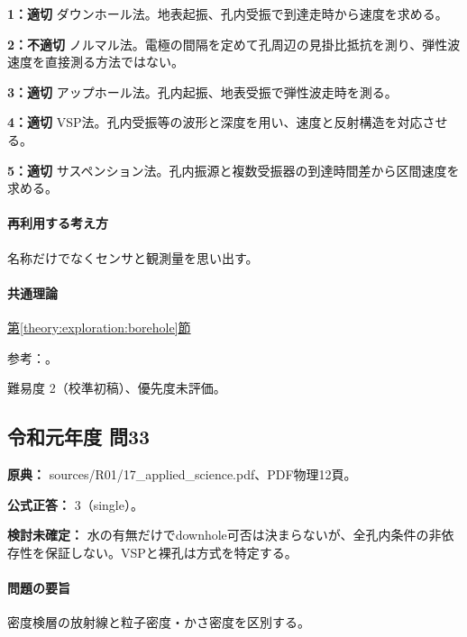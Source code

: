 \noindent\textbf{1：適切} ダウンホール法。地表起振、孔内受振で到達走時から速度を求める。\par

\noindent\textbf{2：不適切} ノルマル法。電極の間隔を定めて孔周辺の見掛比抵抗を測り、弾性波速度を直接測る方法ではない。\par

\noindent\textbf{3：適切} アップホール法。孔内起振、地表受振で弾性波走時を測る。\par

\noindent\textbf{4：適切} VSP法。孔内受振等の波形と深度を用い、速度と反射構造を対応させる。\par

\noindent\textbf{5：適切} サスペンション法。孔内振源と複数受振器の到達時間差から区間速度を求める。\par

\paragraph{再利用する考え方} 名称だけでなくセンサと観測量を思い出す。

\paragraph{共通理論} \hyperref[theory:exploration:borehole]{第\ref*{theory:exploration:borehole}節}

\par 参考：\cite{epa_borehole_resistivity,geebec_ps,oyo_suspension}。

\par 難易度 2（校準初稿）、優先度未評価。

\subsection{令和元年度 問33}
\label{q:r01-reg-applied-33}

\noindent\textbf{原典：} sources/R01/17\_applied\_science.pdf、PDF物理12頁。

\textbf{公式正答：} 3（single）。

\par\textbf{検討未確定：} 水の有無だけでdownhole可否は決まらないが、全孔内条件の非依存性を保証しない。VSPと裸孔は方式を特定する。

\paragraph{問題の要旨} 密度検層の放射線と粒子密度・かさ密度を区別する。

